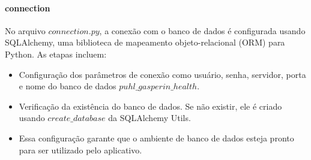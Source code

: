 \documentclass[conference, a4paper, 12pt]{IEEEtran}
\begin{document}
\paragraph{connection}
No arquivo $connection.py$, a conexão com o banco de dados é configurada usando SQLAlchemy, uma biblioteca de mapeamento objeto-relacional (ORM) para Python. As etapas incluem:
\begin{itemize}
    \item Configuração dos parâmetros de conexão como usuário, senha, servidor, porta e nome do banco de dados $puhl\_gasperin\_health$.
    \item Verificação da existência do banco de dados. Se não existir, ele é criado usando $create\_database$ da SQLAlchemy Utils.
    \item Essa configuração garante que o ambiente de banco de dados esteja pronto para ser utilizado pelo aplicativo.
\end{itemize}
\end{document}

